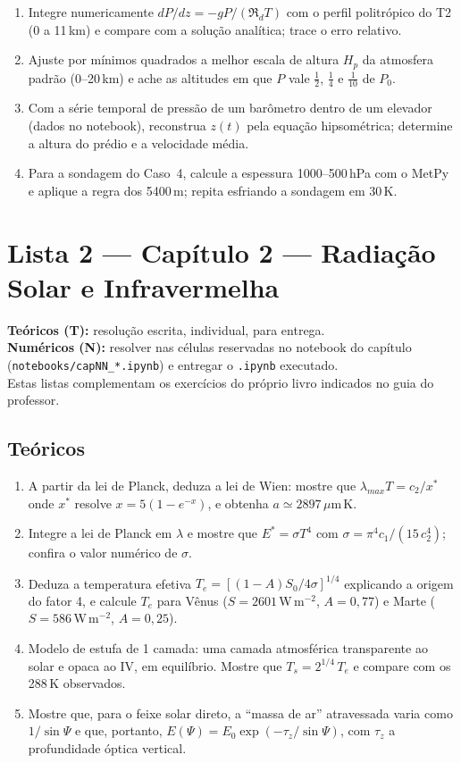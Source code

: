 \documentclass[11pt]{article}
\newcommand{\instrucoes}{%
\begin{caixalista}
\textbf{Teóricos (T):} resolução escrita, individual, para entrega.\\
\textbf{Numéricos (N):} resolver nas células reservadas no notebook do
capítulo (\texttt{notebooks/capNN\_*.ipynb}) e entregar o
\texttt{.ipynb} executado.\\
Estas listas complementam os exercícios do próprio livro indicados no
guia do professor.
\end{caixalista}}
\begin{document}
\begin{enumerate}[label=\textbf{N\arabic*.},itemsep=4pt]
  \item Integre numericamente $dP/dz = -gP/(\Re_d T)$ com o perfil
        politrópico do T2 (0 a 11\,km) e compare com a solução analítica;
        trace o erro relativo.
  \item Ajuste por mínimos quadrados a melhor escala de altura $H_p$ da
        atmosfera padrão (0--20\,km) e ache as altitudes em que $P$ vale
        $\tfrac12$, $\tfrac14$ e $\tfrac1{10}$ de $P_0$.
  \item Com a série temporal de pressão de um barômetro dentro de um
        elevador (dados no notebook), reconstrua $z(t)$ pela equação
        hipsométrica; determine a altura do prédio e a velocidade média.
  \item Para a sondagem do Caso~4, calcule a espessura 1000--500\,hPa com o
        MetPy e aplique a regra dos 5400\,m; repita esfriando a sondagem em
        30\,K.
\end{enumerate}

\clearpage
\section*{Lista 2 --- Capítulo 2 --- Radiação Solar e Infravermelha}
\instrucoes

\subsection*{Teóricos}

\begin{enumerate}[label=\textbf{T\arabic*.},itemsep=4pt]
  \item A partir da lei de Planck, deduza a lei de Wien: mostre que
        $\lambda_{max}T = c_2/x^*$ onde $x^*$ resolve $x = 5(1-e^{-x})$, e
        obtenha $a \simeq 2897\,\mu$m\,K.
  \item Integre a lei de Planck em $\lambda$ e mostre que
        $E^* = \sigma T^4$ com $\sigma = \pi^4 c_1/(15\,c_2^4)$; confira o
        valor numérico de $\sigma$.
  \item Deduza a temperatura efetiva $T_e = [(1-A)S_0/4\sigma]^{1/4}$
        explicando a origem do fator 4, e calcule $T_e$ para Vênus
        ($S = 2601$\,W\,m$^{-2}$, $A = 0{,}77$) e Marte
        ($S = 586$\,W\,m$^{-2}$, $A = 0{,}25$).
  \item Modelo de estufa de 1 camada: uma camada atmosférica transparente
        ao solar e opaca ao IV, em equilíbrio. Mostre que
        $T_s = 2^{1/4}\,T_e$ e compare com os 288\,K observados.
  \item Mostre que, para o feixe solar direto, a ``massa de ar''
        atravessada varia como $1/\sin\Psi$ e que, portanto,
        $E(\Psi) = E_0\exp(-\tau_z/\sin\Psi)$, com $\tau_z$ a profundidade
        óptica vertical.
\end{enumerate}
\end{document}
